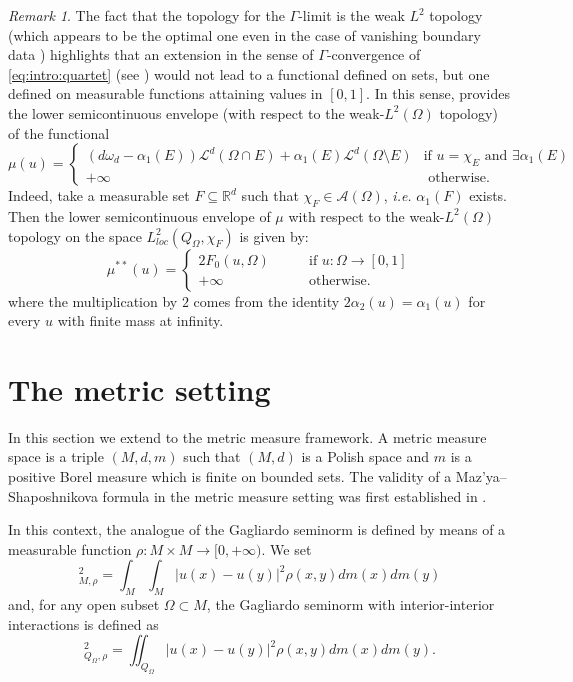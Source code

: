 \documentclass[reqno,11pt]{amsart}
\numberwithin{equation}{section}
\theoremstyle{definition} %
\theoremstyle{plain}
\theoremstyle{definition}
\theoremstyle{remark}
\newtheorem{remark}[remark]{Remark}
\def\elle#1{L^{#1}}
\def\elleom#1{L^{#1}(\Omega)}
\def\Qom{{Q_\Omega}}
\def\O{\Omega}
\def\semin#1#2{ [#1 ]_{#2}}
\def\R{\mathbb{R}}
\newcommand{\abs}[1]{\left|#1\right|}
\begin{document}
\begin{remark}
    The fact that the topology for the $\Gamma$-limit is the weak $\elle2$ topology (which appears to be the optimal one even in the case of vanishing boundary data \cite{CriDLKNP23}) highlights that an extension in the sense of $\Gamma$-convergence of \eqref{eq:intro:quartet} (see \cite[Theorem 2.5]{Quartet}) would not lead to a functional defined on sets, but one defined on measurable functions attaining values in $[0,1]$. 
    In this sense,  provides the lower semicontinuous envelope (with respect to the weak-$\elleom2$ topology) of the functional
    \[
    \mu(u)=\begin{cases}
        (d\omega_d-\alpha_1(E))\mathcal{L}^d(\O\cap E)+\alpha_1(E)\mathcal{L}^d(\O\setminus E )& \text{if }u=\chi_E\text{ and }\exists \alpha_1(E)\\
        +\infty&\text{ otherwise}.
    \end{cases}
    \]
    Indeed, take a measurable set $F\subseteq \R^d$ such that $\chi_F\in\mathcal{A}(\O)$, \textit{i.e.} $\alpha_1(F)$ exists. 
    Then the lower semicontinuous envelope of $\mu$ with respect to the weak-$L^2(\O)$ topology on the space $L^2_{loc}(Q_\O,\chi_F)$ is given by: 
    \[
    \mu^{**}(u)=\begin{cases}
        2F_0(u,\O)\qquad&\text{if }u:\Omega\to[0,1]\\
        +\infty\qquad&\text{otherwise}.
    \end{cases}
    \]
    where the multiplication by $2$ comes from the identity $2\alpha_2(u)=\alpha_1(u)$ for every $u$ with finite mass at infinity.
\end{remark}

\section{The metric setting}\label{Sec:puntuale mms}
In this section we extend  to the metric measure framework. A metric measure space is a triple $(M,d,m)$ such that $(M,d)$ is a Polish space and $m$ is a positive Borel measure which is finite on bounded sets.
The validity of a Maz’ya–Shaposhnikova formula in the metric measure setting was first established in \cite{Han-MS&BBM}.

In this context, the analogue of the Gagliardo seminorm is defined by means of a measurable function $\rho:M\times M\to [0,+\infty)$. We set
\begin{equation}
    \semin{u}{M,\rho}^2=\int_M\int_M \abs{u(x)-u(y)}^2\rho(x,y)dm(x)dm(y)
\end{equation}
and, for any open subset $\Omega\subset M$, the Gagliardo seminorm with interior-interior interactions is defined as
\begin{equation}
    \semin{u}{\Qom,\rho}^2=\iint_\Qom \abs{u(x)-u(y)}^2\rho(x,y)dm(x)dm(y).
\end{equation}
\end{document}
